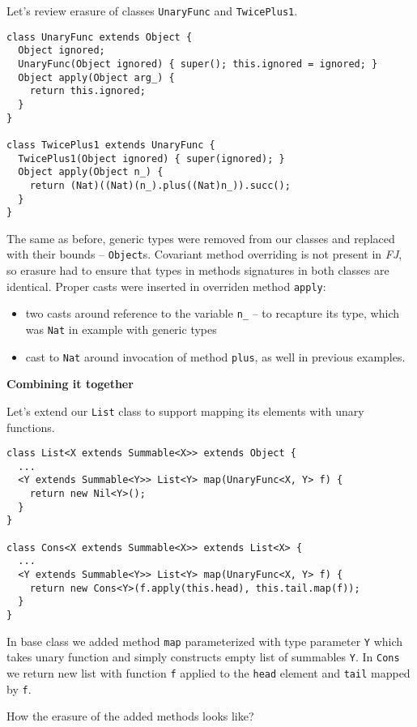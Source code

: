 \documentclass{article}[12pt]
\begin{document}
Let's review erasure of classes \texttt{UnaryFunc} and
\texttt{TwicePlus1}.

\begin{verbatim}
class UnaryFunc extends Object {
  Object ignored;
  UnaryFunc(Object ignored) { super(); this.ignored = ignored; }
  Object apply(Object arg_) {
    return this.ignored;
  }
}

class TwicePlus1 extends UnaryFunc {
  TwicePlus1(Object ignored) { super(ignored); }
  Object apply(Object n_) {
    return (Nat)((Nat)(n_).plus((Nat)n_)).succ();
  }
}
\end{verbatim}

The same as before, generic types were removed from our classes
and replaced with their bounds -- \texttt{Object}s. Covariant
method overriding is not present in \emph{FJ}, so erasure had
to ensure that types in methods signatures in both classes are
identical. Proper casts were inserted in overriden method
\texttt{apply}:

\begin{itemize}
\item two casts around reference to the variable \texttt{n\_} --
  to recapture its type, which was \texttt{Nat} in example with
  generic types
\item cast to \texttt{Nat} around invocation of method
  \texttt{plus}, as well in previous examples.
\end{itemize}
\textbf{Combining it together}

Let's extend our \texttt{List} class to support mapping its
elements with unary functions.

\begin{verbatim}
class List<X extends Summable<X>> extends Object {
  ...
  <Y extends Summable<Y>> List<Y> map(UnaryFunc<X, Y> f) {
    return new Nil<Y>();
  }
}

class Cons<X extends Summable<X>> extends List<X> {
  ...
  <Y extends Summable<Y>> List<Y> map(UnaryFunc<X, Y> f) {
    return new Cons<Y>(f.apply(this.head), this.tail.map(f));
  }
}
\end{verbatim}

In base class we added method \texttt{map} parameterized with
type parameter \texttt{Y} which takes unary function and simply
constructs empty list of summables \texttt{Y}. In \texttt{Cons}
we return new list with function \texttt{f} applied to the
\texttt{head} element and \texttt{tail} mapped by \texttt{f}.

How the erasure of the added methods looks like?
\end{document}
